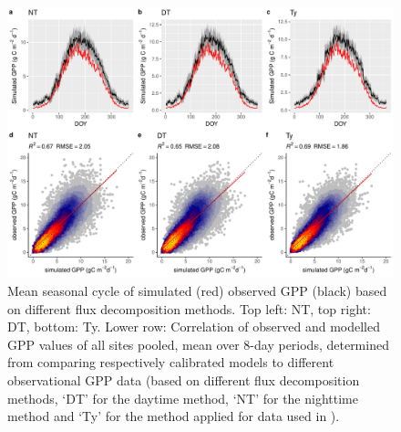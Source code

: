 \documentclass{myreport}
\begin{document}
 \begin{figure}[!ht]
\includegraphics[width=\textwidth]{fig/meandoy_modobs_gpp_data.pdf}
    \caption{Mean seasonal cycle of simulated (red) observed GPP (black) based on different flux decomposition methods. Top left: NT, top right: DT, bottom: Ty.
    Lower row: Correlation of observed and modelled GPP values of all sites pooled, mean over 8-day periods, determined from comparing respectively calibrated models to different observational GPP data (based on different flux decomposition methods, `DT' for the daytime method, `NT' for the nighttime method and `Ty' for the method applied for data used in \cite{wang17rs}).}
    \label{fig:season3}
\end{figure}




\end{document}
